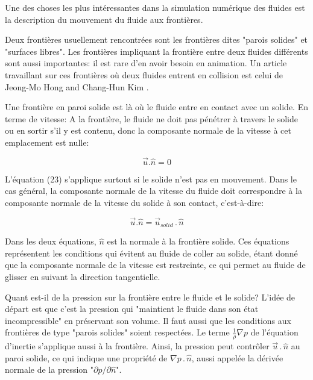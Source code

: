 \documentclass[11pt]{report}
\begin{document}
Une des choses les plus intéressantes dans la simulation numérique des fluides est la description du mouvement du fluide aux frontières. 

Deux frontières usuellement rencontrées sont les frontières dites "parois solides" et "surfaces libres". Les frontières impliquant la frontière entre deux fluides différents sont aussi importantes: il est rare d'en avoir besoin en animation. Un article travaillant sur ces frontières où deux fluides entrent en collision est celui de Jeong-Mo Hong and Chang-Hun Kim \cite{Hong-05}.

Une frontière en paroi solide est là où le fluide entre en contact avec un solide. En terme de vitesse: A la frontière, le fluide ne doit pas pénétrer à travers le solide ou en sortir s'il y est contenu, donc la composante normale de la vitesse à cet emplacement est nulle:

\begin{equation}
\overrightarrow{u}.\hat{n} = 0
\end{equation}

L'équation (23) s'applique surtout si le solide n'est pas en mouvement. Dans le cas général, la composante normale de la vitesse du fluide doit correspondre à la composante normale de la vitesse du solide à son contact, c'est-à-dire:

\begin{equation}
\overrightarrow{u}.\hat{n} = \overrightarrow{u}\!\!_{solid} \,.\, \hat{n}
\end{equation}

Dans les deux équations, $ \hat{n} $ est la normale à la frontière solide.
Ces équations représentent les conditions qui évitent au fluide de coller au solide, étant donné que la composante normale de la vitesse est restreinte, ce qui permet au fluide de glisser en suivant la direction tangentielle.\newline

Quant est-il de la pression sur la frontière entre le fluide et le solide? L'idée de départ est que c'est la pression qui "maintient le fluide dans son état incompressible" en préservant son volume. Il faut aussi que les conditions aux frontières de type "parois solides" soient respectées. Le terme $ \frac{1}{\rho}\nabla p$ de l'équation d'inertie s'applique aussi à la frontière. Ainsi, la pression peut contrôler $  \overrightarrow{u} \,.\, \hat{n} $ au paroi solide, ce qui indique une propriété de $ \nabla p \,.\, \hat{n} $, aussi appelée la dérivée normale de la pression "$ \partial p / \partial \hat{n} $".\newline
\end{document}
